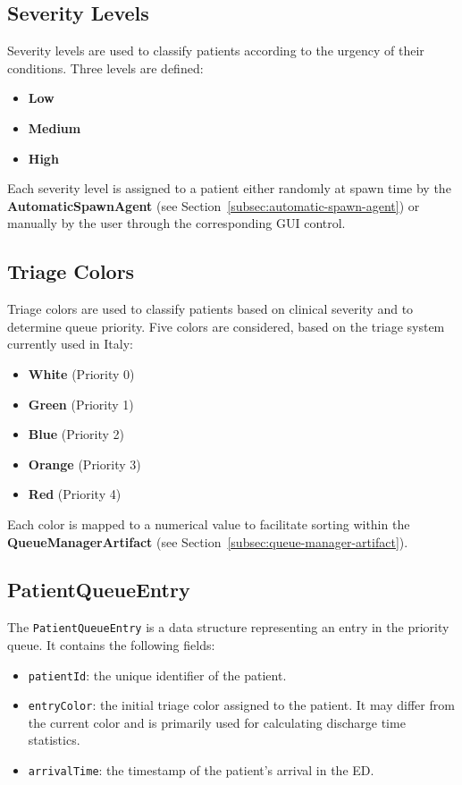 \documentclass{article}[12pt]
\begin{document}
\subsection{Severity Levels}
\label{subsec:severity-levels}
Severity levels are used to classify patients according to the urgency of their conditions. Three levels are defined:
\begin{itemize}
    \item \textbf{Low}
    \item \textbf{Medium}
    \item \textbf{High}
\end{itemize}
Each severity level is assigned to a patient either randomly at spawn time by the \textbf{AutomaticSpawnAgent} (see Section~\ref{subsec:automatic-spawn-agent}) or manually by the user through the corresponding GUI control.

\subsection{Triage Colors}
\label{subsec:triage-colors}
Triage colors are used to classify patients based on clinical severity and to determine queue priority. Five colors are considered, based on the triage system currently used in Italy:
\begin{itemize}
    \item \textbf{White} (Priority 0)
    \item \textbf{Green} (Priority 1)
    \item \textbf{Blue} (Priority 2)
    \item \textbf{Orange} (Priority 3)
    \item \textbf{Red} (Priority 4)
\end{itemize}
Each color is mapped to a numerical value to facilitate sorting within the \textbf{QueueManagerArtifact} (see Section~\ref{subsec:queue-manager-artifact}).

\subsection{PatientQueueEntry}
\label{subsec:patient-queue-entry}
The \texttt{PatientQueueEntry} is a data structure representing an entry in the priority queue. It contains the following fields:
\begin{itemize}
    \item \texttt{patientId}: the unique identifier of the patient.
    \item \texttt{entryColor}: the initial triage color assigned to the patient. It may differ from the current color and is primarily used for calculating discharge time statistics.
    \item \texttt{arrivalTime}: the timestamp of the patient's arrival in the ED.
\end{itemize}
\end{document}
